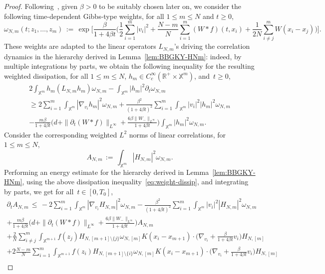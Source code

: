 \documentclass[a4paper,11pt,reqno,noindent]{amsart}
\theoremstyle{plain}
\theoremstyle{definition}
\numberwithin{equation}{section}
\newcommand{\Xd}{\mathbb X}
\newcommand{\R}{\mathbb R}
\begin{document}
\begin{proof}
Following~\cite{BJS-22}, given $\beta>0$ to be suitably chosen later on, we consider the following time-dependent Gibbs-type weights, for all $1\le m\le N$ and $t\ge0$,
\begin{equation*}
\omega_{N,m}(t;z_1,\ldots,z_m)
\,:=\,\exp\bigg[\frac{\beta}{1+4\beta t}\bigg(\frac12\sum_{i=1}^m|v_i|^2
+\frac{N-m}N\sum_{i=1}^m(W\ast f)(t,x_i)
+\frac1{2N}\sum_{i\ne j}^mW(x_i-x_j)\bigg)\bigg].
\end{equation*}
These weights are adapted to the linear operators $L_{N,m}$'s driving the correlation dynamics in the hierarchy derived in Lemma~\ref{lem:BBGKY-HNm}: indeed, by multiple integrations by parts, we obtain the following inequality for the resulting weighted dissipation, for all $1\le m\le N$, $h_m\in C^\infty_c(\R^+\times\Xd^m)$, and~$t\ge0$,
\begin{multline}\label{eq:weight-dissip}
2\int_{\Xd^m} h_m(L_{N,m}h_m)\omega_{N,m}-\int_{\Xd^m}|h_m|^2\partial_t\omega_{N,m}\\
\ge
2\sum_{i=1}^m\int_{\Xd^m} |\nabla_{v_i}h_m|^2\omega_{N,m}
+\frac{\beta^2}{(1+4\beta t)^2}\sum_{i=1}^m\int_{\Xd^m}|v_i|^2|h_m|^2\omega_{N,m}\\
-\frac{m\beta}{1+4\beta t}\Big(d+\|\partial_t(W\ast f)\|_{L^\infty}+\frac{6\beta \|W_-\|_{L^\infty}}{1+4\beta t}\Big)\int_{\Xd^m}|h_m|^2\omega_{N,m}.
\end{multline}
Consider the corresponding weighted $L^2$ norms of linear correlations, for $1\le m\le N$,
\[A_{N,m}\,:=\,\int_{\Xd^m}|H_{N,m}|^2\omega_{N,m}.\]
Performing an energy estimate for the hierarchy derived in Lemma~\ref{lem:BBGKY-HNm}, using the above dissipation inequality~\eqref{eq:weight-dissip}, and integrating by parts, we get for all~$t\in[0,T_0]$,
\begin{multline*}
\partial_tA_{N,m}\,\le\,
-2\sum_{i=1}^m\int_{\Xd^m} |\nabla_{v_i}H_{N,m}|^2\omega_{N,m}
-\frac{\beta^2}{(1+4\beta t)^2}\sum_{i=1}^m\int_{\Xd^m}|v_i|^2|H_{N,m}|^2\omega_{N,m}\\
+\frac{m\beta}{1+4\beta t}\Big(d+\|\partial_t(W\ast f)\|_{L^\infty}+\frac{6\beta \|W_-\|_{L^\infty}}{1+4\beta t}\Big)A_{N,m}\\
+\frac{2}N\sum_{i\ne j}^m\int_{\Xd^{m+1}}f(z_j) H_{N,[m+1]\setminus\{j\}}\omega_{N,[m]}K(x_i-x_{m+1})\cdot\Big(\nabla_{v_i}+\frac{\beta}{1+4\beta t}v_i\Big)H_{N,[m]}\\
+2\frac{N-m}N\sum_{i=1}^m\int_{\Xd^{m+1}}f(z_i) H_{N,[m+1]\setminus\{i\}}\omega_{N,[m]}K(x_i-x_{m+1})\cdot \Big(\nabla_{v_i}+\frac{\beta}{1+4\beta t}v_i\Big)H_{N,[m]}\\

\end{multline*}
\end{proof}
\end{document}
